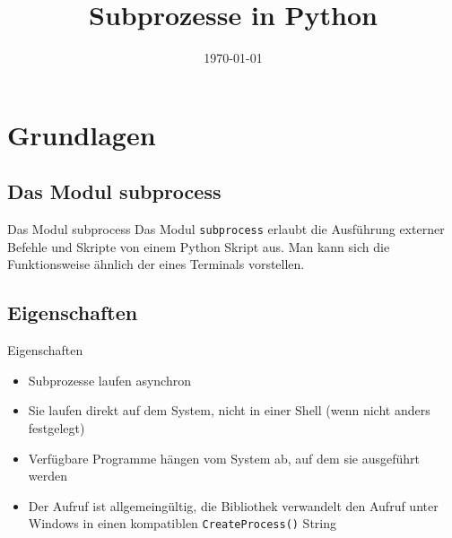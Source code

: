 


\newcommand{\topic}{
	Subprozesse in Python
}

\title{\topic}
\supertitle{\course}
\date{\today}



\maketitle

\begin{frame}
	\tableofcontents
\end{frame}


\section{Grundlagen}
\subsection{Das Modul subprocess}
\begin{frame}[fragile]{Das Modul subprocess}
	Das Modul \texttt{subprocess} erlaubt die Ausf\"uhrung externer Befehle und
	Skripte von einem Python Skript aus. Man kann sich die Funktionsweise \"ahnlich
	der eines Terminals vorstellen.
\end{frame}


\subsection{Eigenschaften}
\begin{frame}[fragile]{Eigenschaften}
	\begin{itemize}
		\item Subprozesse laufen asynchron
		\item Sie laufen direkt auf dem System, nicht in einer Shell
		(wenn nicht anders festgelegt)
		\item Verf\"ugbare Programme h\"angen vom System ab, auf dem sie ausgef\"uhrt werden
		\item Der Aufruf ist allgemeing\"ultig, die Bibliothek verwandelt den
		Aufruf unter Windows in einen kompatiblen \texttt{CreateProcess()} String
	\end{itemize}
\end{frame}


